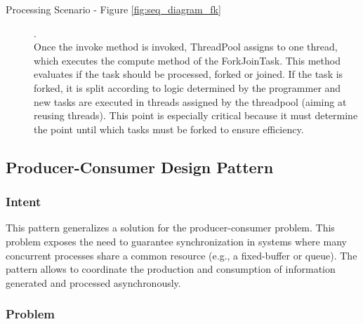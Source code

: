
\begin{description}
	
	
	
	\item[Processing Scenario - Figure \ref{fig:seq_diagram_fk}].\\
	
	Once the invoke method is invoked, ThreadPool assigns to one thread, which executes the compute method of the ForkJoinTask. This method evaluates if the task should be processed, forked or joined. If the task is forked, it is split according to logic determined by the programmer and new tasks are executed in threads assigned by the threadpool (aiming at reusing threads). This point is especially critical because it must determine the point until which tasks must be forked to ensure efficiency. 
	
\end{description}

\subsection{Producer-Consumer Design Pattern}

\subsubsection{Intent}

This pattern generalizes a solution for the producer-consumer problem. This problem exposes the need to guarantee synchronization in systems where many concurrent processes share a common resource (e.g., a fixed-buffer or queue). The pattern allows to coordinate the production and consumption of information generated and processed asynchronously.

\subsubsection{Problem}

